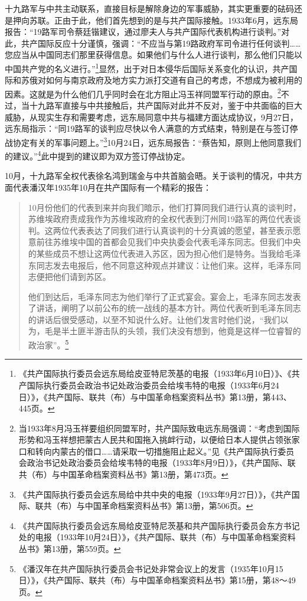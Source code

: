 十九路军与中共主动联系，直接目标是解除身边的军事威胁，其实更重要的砝码还是押向苏联。正由于此，他们首先想到的是与共产国际接触。1933年6月，远东局报告：“19路军司令蔡廷锴建议，通过廖夫人与共产国际代表机构进行谈判。”对此，共产国际反应十分谨慎，强调：“不应当与第19路政府军司令进行任何谈判……您应当从中国同志们那里获得信息。如果他们与什么人进行谈判，那么他们只能以中国共产党的名义进行。”\footnote{《共产国际执行委员会远东局给皮亚特尼茨基的电报（1933年6月10日）》、《共产国际执行委员会政治书记处政治委员会给埃韦特的电报（1933年6月24日）》，《共产国际、联共（布）与中国革命档案资料丛书》第13册，第443、445页。}显然，出于对日本侵华后国际关系变化的认识，共产国际和苏俄对如何与南京政府及地方实力派打交道有自己的考虑，不想成为被利用的因素。这就是为什么他们几乎同时会在北方阻止冯玉祥同盟军行动的原由。\footnote{当1933年8月冯玉祥要组织同盟军时，共产国际致电远东局强调：“考虑到国际形势和冯玉祥想把蒙古人民共和国拖入挑衅行动，以便给日本人提供占领张家口和转向内蒙古的借口……请采取一切措施阻止起义。”见《共产国际执行委员会政治书记处政治委员会给埃韦特的电报（1933年8月9日）》，《共产国际、联共（布）与中国革命档案资料丛书》第13册，第473页。}不过，当十九路军直接与中共接触后，共产国际对此并不反对，鉴于中共面临的巨大威胁，从现实生存和需要考虑，远东局同意中共与福建方面达成协议，9月27日，远东局指示：“同19路军的谈判应尽快以令人满意的方式结束，特别是在与签订停战协定有关的军事问题上。”\footnote{《共产国际执行委员会远东局给中共中央的电报（1933年9月27日）》，《共产国际、联共（布）与中国革命档案资料丛书》第13册，第506页。}10月24日，远东局报告：“蔡告知，原则上他同意我们的建议。”\footnote{《共产国际执行委员会远东局给皮亚特尼茨基和共产国际执行委员会东方书记处的电报（1933年10月24日）》，《共产国际、联共（布）与中国革命档案资料丛书》第13册，第559页。}此中提到的建议即为双方签订停战协定。


10月，十九路军全权代表徐名鸿到瑞金与中共首脑会晤。关于谈判的情况，中共方面代表潘汉年1935年10月在共产国际有一个精彩的报告：

\begin{quote}

10月份他们的代表到来并向我们暗示，他们打算同我们进行认真的谈判时，苏维埃政府责成我作为苏维埃政府的全权代表到汀州同19路军的两位代表谈判。这两位代表表达了同我们进行认真谈判的十分真诚的愿望，甚至表示愿意前往苏维埃中国的首都会见我们中央执委会代表毛泽东同志。但我们中央的某些成员不想让这两位代表进入苏区，因为担心他们是特务。当我给毛泽东同志发去电报后，他不同意这种观点并建议：让他们来。这样，毛泽东同志便把他们请到苏区。

他们到达后，毛泽东同志为他们举行了正式宴会。宴会上，毛泽东同志发表了讲话，阐明了以前公布的统一战线的基本方针。两位代表听到毛泽东同志的讲话后很受感动，以至不知说什么好。让他们发言时他们说，“我们以为，毛是半土匪半游击队的头领，我们决没有想到，他竟是这样一位睿智的政治家”。\footnote{《潘汉年在共产国际执行委员会书记处非常会议上的发言（1935年10月15日）》，《共产国际、联共（布）与中国革命档案资料丛书》第15册，第48～49页。}
\end{quote}


